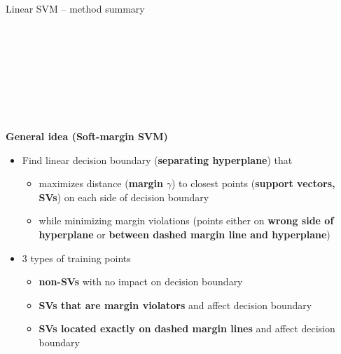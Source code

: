 \documentclass[11pt,compress,t,notes=noshow, xcolor=table]{beamer}
\newcommand{\highlight}[1]{\textcolor{hlcol}{\textbf{#1}}}
\newcommand{\maketag}[2][100]{
  \colorbox{hlcol!#1}{\textcolor{white}{\MakeUppercase{\scriptsize #2}} 
  \vphantom{}}
}
\begin{document}
\begin{vbframe}{Linear SVM -- method summary}
  \maketag{CLASSIFICATION} \maketag[50]{REGRESSION} \maketag{PARAMETRIC} 
\maketag{WHITE-BOX} 
\medskip



\begin{columns}[T]
\begin{column}{0.7\linewidth}
\highlight{General idea (Soft-margin SVM)}
\begin{itemize}
\item Find linear decision boundary (\textbf{separating hyperplane}) that 
\begin{itemize}
  \item maximizes distance (\textbf{margin} $\gamma$) to closest points (\textbf{support vectors, SVs}) on each side of decision boundary
  \item while minimizing margin violations (points either on \textbf{wrong side of hyperplane} or \textbf{between dashed margin line and hyperplane})
\end{itemize}
\item 3 types of training points
\begin{itemize}
  \item \textbf{non-SVs} with no impact on decision boundary
  \item \textbf{SVs that are margin violators} and affect decision boundary
  \item \textbf{SVs located exactly on dashed margin lines} and affect decision boundary
\end{itemize}
\end{itemize}



\end{column}
\end{columns}
\end{vbframe}
\end{document}
